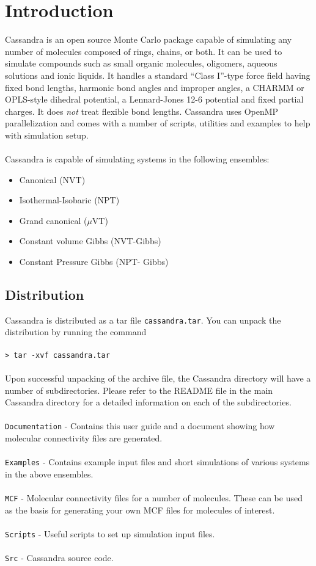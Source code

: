 \chapter{Introduction}
Cassandra is an open source Monte Carlo package capable of simulating
any number of molecules composed of rings, chains, or both. It can be
used to simulate compounds such as small organic molecules, oligomers,
aqueous solutions and ionic liquids. It handles a standard ``Class
I''-type force field having fixed bond lengths, harmonic bond angles
and improper angles, a CHARMM or OPLS-style dihedral potential, a
Lennard-Jones 12-6 potential and fixed partial charges. It does {\em
  not} treat flexible bond lengths. Cassandra uses OpenMP parallelization and comes
with a number of scripts, utilities and examples to help with
simulation setup. \\ \\ 
%
Cassandra is capable of simulating systems in the following ensembles: \\ 
%
\begin{itemize}
\item Canonical (NVT) 
\item Isothermal-Isobaric (NPT) 
\item Grand canonical ($\mu$VT) 
\item Constant volume Gibbs (NVT-Gibbs) 
\item Constant Pressure Gibbs (NPT- Gibbs)
\end{itemize}

\section{Distribution}
Cassandra is distributed as a tar file \texttt{cassandra.tar}. You can unpack the distribution by running the command \\ \\
%
\texttt{> tar -xvf cassandra.tar} \\ \\
%
Upon successful unpacking of the archive file, the Cassandra directory will have a number of subdirectories. Please refer to the README file in the main Cassandra directory for a detailed information on each of the subdirectories. \\ \\
%
\texttt{Documentation} - Contains this user guide and a document showing how molecular connectivity files are generated.\\ \\
%
\texttt{Examples} - Contains example input files and short simulations of various systems in the above ensembles. \\ \\
%
\texttt{MCF} - Molecular connectivity files for a number of
molecules. These can be used as the basis for generating your own MCF files for
molecules of interest. \\ \\ 
%
\texttt{Scripts} - Useful scripts to set up simulation input files. \\ \\
%
\texttt{Src} - Cassandra source code. \\ \\
